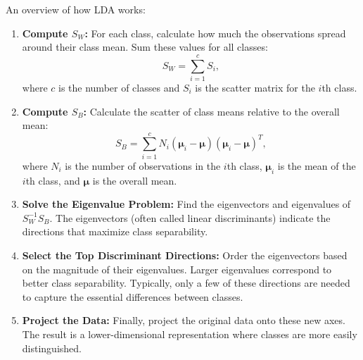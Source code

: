 \documentclass[10pt]{article}
\begin{document}
An overview of how LDA works:
\begin{enumerate}
    \item \textbf{Compute \(S_W\):}  
    For each class, calculate how much the observations spread around their class mean. Sum these values for all classes:
    \[
    S_W = \sum_{i=1}^c S_i,
    \]
    where \(c\) is the number of classes and \(S_i\) is the scatter matrix for the \(i\)th class.
    
    \item \textbf{Compute \(S_B\):}  
    Calculate the scatter of class means relative to the overall mean:
    \[
    S_B = \sum_{i=1}^c N_i (\boldsymbol{\mu}_i - \boldsymbol{\mu})(\boldsymbol{\mu}_i - \boldsymbol{\mu})^T,
    \]
    where \(N_i\) is the number of observations in the \(i\)th class, \(\boldsymbol{\mu}_i\) is the mean of the \(i\)th class, and \(\boldsymbol{\mu}\) is the overall mean.
    
    \item \textbf{Solve the Eigenvalue Problem:}  
    Find the eigenvectors and eigenvalues of \(S_W^{-1} S_B\). The eigenvectors (often called linear discriminants) indicate the directions that maximize class separability.
    
    \item \textbf{Select the Top Discriminant Directions:}  
    Order the eigenvectors based on the magnitude of their eigenvalues. Larger eigenvalues correspond to better class separability. Typically, only a few of these directions are needed to capture the essential differences between classes.
    
    \item \textbf{Project the Data:}  
    Finally, project the original data onto these new axes. The result is a lower-dimensional representation where classes are more easily distinguished.
\end{enumerate}
\end{document}
